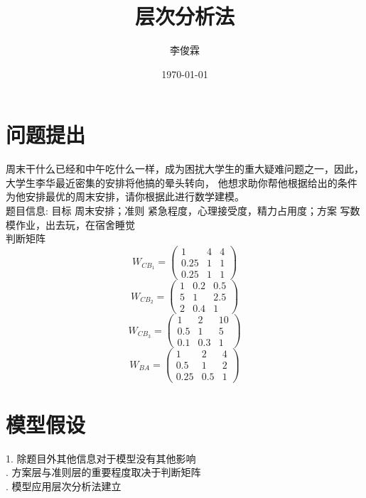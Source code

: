 \documentclass{article}
\title{层次分析法}
\author{李俊霖}
\date{\today}
\begin{document}
\maketitle
\section{问题提出}
周末干什么已经和中午吃什么一样，成为困扰大学生的重大疑难问题之一，因此，大学生李华最近密集的安排将他搞的晕头转向，
他想求助你帮他根据给出的条件为他安排最优的周末安排，请你根据此进行数学建模。
\\ \indent 题目信息: 目标 周末安排；准则 紧急程度，心理接受度，精力占用度；方案 写数模作业，出去玩，在宿舍睡觉
\\ \indent 判断矩阵
\[
W_{CB_1} = \begin{pmatrix}
1 & 4 & 4 \\
0.25 & 1  & 1 \\
0.25 & 1  & 1
\end{pmatrix}
\]
\[
W_{CB_2} = \begin{pmatrix}
1 & 0.2 & 0.5 \\
5& 1  & 2.5 \\
2 & 0.4  & 1
\end{pmatrix}
\]
\[
W_{CB_3} = \begin{pmatrix}
1 & 2 & 10 \\
0.5& 1  & 5 \\
0.1 & 0.3  & 1
\end{pmatrix}
\]
\[
W_{BA} = \begin{pmatrix}
1 & 2 & 4 \\
0.5& 1  & 2 \\
0.25 & 0.5  & 1
\end{pmatrix}
\]
\section{模型假设}
1. 除题目外其他信息对于模型没有其他影响
\\ . 方案层与准则层的重要程度取决于判断矩阵
\\ . 模型应用层次分析法建立
\end{document}
